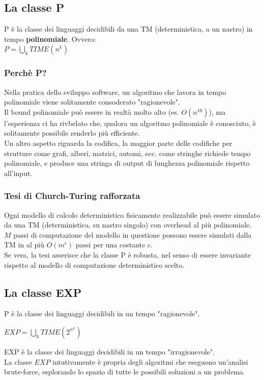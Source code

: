 \documentclass[a4paper, 12pt]{article}
\begin{document}
\subsection{La classe P}
\begin{center}
P \`e la classe dei linguaggi decidibili da una TM (deterministica, a un nastro) in tempo \textbf{polinomiale}. Ovvero:\\
$P = \bigcup_{k} TIME(n^{k})$
\end{center}
\subsubsection{Perch\`e P?}
Nella pratica dello sviluppo software, un algoritmo che lavora in tempo polinomiale viene solitamente consoderato "ragionevole".\\ Il bound polinomiale pu\`o essere in realt\`a molto alto (es. $O(n^{10})$), ma l'esperienza ci ha rivbelato che, qualora un algoritmo polinomiale \`e conosciuto, \`e solitamente possibile renderlo pi\`u efficiente.\\Un altro aspetto riguarda la codifica, la maggior parte delle codifiche per strutture come grafi, alberi, matrici, automi, ecc. come stringhe richiede tempo polinomiale, e produce una stringa di output di lunghezza polinomiale rispetto all'input.
\subsubsection{Tesi di Church-Turing rafforzata}
Ogni modello di calcolo deterministico fisicamente realizzabile pu\`o essere simulato da una TM (deterministica, su nastro singolo) con overhead al pi\`u polinomiale.\\
$M$ passi di computazione del modello in questione possono essere simulati dalla TM in al pi\`u $O(m^{c})$ passi per una costante $c$.\\
Se vera, la tesi asserisce che la classe P \`e robusta, nel senso di essere invariante rispetto al modello di computazione deterministico scelto.
\subsection{La classe EXP}
P \`e la classe dei linguaggi decidibili in un tempo "ragionevole". \begin{center}
$EXP = \bigcup_{k} TIME(2^{n^{k}})$
\end{center}
EXP \`e la classe dei linguaggi decidibili in un tempo "irragionevole".\\
La classe $EXP$ intutivamente \`e propria degli algoritmi che eseguono un'analisi brute-force, esplorando lo spazio di tutte le possibili soluzioni a un problema.
\end{document}
